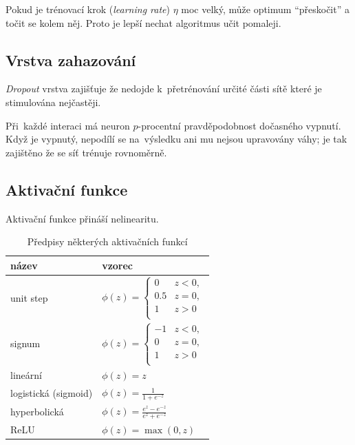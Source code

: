 Pokud je trénovací krok (\emph{learning rate}) $\eta$ moc velký, může optimum \enquote{přeskočit} a točit se kolem něj. Proto je lepší nechat algoritmus učit pomaleji.

\subsection{Vrstva zahazování}

\emph{Dropout} vrstva zajišťuje že nedojde k~přetrénování určité části sítě které je stimulována nejčastěji.

Při~každé interaci má neuron $p$-procentní pravděpodobnost dočasného vypnutí.
Když je vypnutý, nepodílí se na~výsledku ani mu nejsou upravovány váhy; je tak zajištěno že se síť trénuje rovnoměrně.

\subsection{Aktivační funkce}

Aktivační funkce přináší nelinearitu.

\begin{table}[ht]
\onehalfspacing
\centering
\begin{tabular}{|l|l|}
    název & vzorec \\ \hline \hline
    unit step & $\phi(z) = \begin{cases}
    0 & z < 0, \\
    0.5 & z = 0, \\
    1 & z > 0 \\
    \end{cases}$ \\
    signum & $\phi(z) = \begin{cases}
    -1 & z < 0, \\
    0 & z = 0, \\
    1 & z > 0 \\
    \end{cases}$ \\
    lineární & $\phi(z) = z$ \\
    logistická (sigmoid) & $\phi(z) = \frac{1}{1 + e^{-z}}$ \\
    hyperbolická & $\phi(z) = \frac{e^z - e^{-z}}{e^z + e^{-z}}$ \\
    ReLU & $\phi(z) = \max(0, z)$ \\
\end{tabular}
\caption{Předpisy některých aktivačních funkcí}
\end{table}
\FloatBarrier

